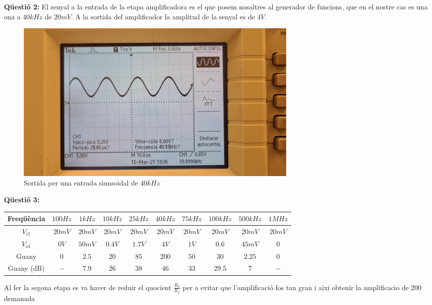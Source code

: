 \documentclass[12pt, a4papre]{article}
\begin{document}
	\textbf{Qüestió 2:} El senyal a la entrada de la etapa amplificadora es el que posem nosaltres al generador de funcions, que en el nostre cas es una ona a $40kHz$ de $20mV$. A la sortida del amplificador la amplitud de la senyal es de $4V$.
	
	\begin{figure}[H]
		\begin{center}
		\includegraphics[width=140mm]{img_2_2.jpeg}
		\caption{Sortida per una entrada sinusoidal de $40kHz$}
		\end{center}
	\end{figure}
	
	\textbf{Qüestió 3:}
	
	\begin{center}
		\scriptsize
		\begin{tabular}{ |c|c|c|c|c|c|c|c|c|c| } 
			\hline
			Freqüència & $100Hz$ & $1kHz$ & $10kHz$ & $25kHz$ & $40kHz$ & $75kHz$ & $100kHz$ & $500kHz$ & $1MHz$\\ \hline
			$V_{i1}$ & $20mV$ & $20mV$ & $20mV$ & $20mV$ & $20mV$ & $20mV$ & $20mV$ & $20mV$ & $20mV$\\ \hline
			$V_{o1}$ & $0V$ & $50mV$ & $0.4V$ & $1.7V$ & $4V$ & $1V$ & $0.6$ & $45mV$ & $0$\\ \hline
			Guany & $0$ & $2.5$ & $20$ & $85$ & $200$ & $50$ & $30$ & $2.25$ & $0$\\ \hline
			Guany (dB) & $-$ & $7.9$ & $26$ & $38$ & $46$ & $33$ & $29.5$ & $7$ & $-$\\ \hline
		\end{tabular}
	\end{center}
	
	Al fer la segona etapa es va haver de reduir el quocient $\frac{R_2}{R_1}$ per a evitar que l'amplificació fos tan gran i aixi obtenir la amplificacio de 200 demanada
	
\end{document}
